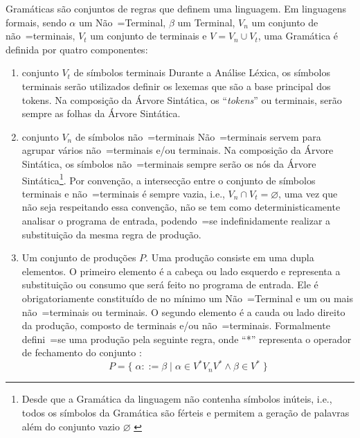 {    Gramáticas são conjuntos de regras que definem uma linguagem.
    Em linguagens formais,
    sendo $\alpha$ um Não~=Terminal,
    $\beta$ um Terminal,
    $V_n$ um conjunto de não~=terminais,
    $V_t$ um conjunto de terminais e
    $V = V_n \cup V_t$,
    uma Gramática é definida por quatro componentes:
    \begin{enumerate}%
        \item {} conjunto $V_t$ de símbolos terminais%
        Durante a Análise Léxica,
        os símbolos terminais serão utilizados definir os lexemas que são a base principal dos tokens.
        Na composição da Árvore Sintática,
        os ``\textit{tokens}'' ou terminais,
        serão sempre as folhas da Árvore Sintática.

        \item {} conjunto $V_n$ de símbolos
        não~=terminais
        Não~=terminais servem para agrupar vários não~=terminais e\slash{}ou terminais.
        Na composição da Árvore Sintática,
        os símbolos não~=terminais sempre serão os nós da Árvore Sintática\footnote{
        Desde que a Gramática da linguagem não contenha símbolos inúteis,
        i.e.,
        todos os símbolos da Gramática são férteis e
        permitem a geração de palavras além do conjunto vazio $\varnothing$ \cite{hopcroftBook}
        }.
        Por convenção,
        a intersecção entre o conjunto de símbolos terminais e
        não~=terminais é sempre vazia,
        i.e.,
        $V_n \cap V_t = \varnothing$,
        uma vez que não seja respeitando essa convenção,
        não se tem como deterministicamente analisar o programa de entrada,
        podendo~=se indefinidamente realizar a substituição da mesma regra de produção.

        \item \label{definicaoDeGramatica}Um conjunto de produções $P$.
        Uma produção consiste em uma dupla elementos.
        O primeiro elemento é a cabeça ou
        lado esquerdo e
        representa a substituição ou
        consumo que será feito no programa de entrada.
        Ele é obrigatoriamente constituído de no mínimo um Não~=Terminal e
        um ou mais não~=terminais ou
        terminais.
        O segundo elemento é a cauda ou
        lado direito da produção,
        composto de terminais e\slash{}ou não~=terminais.
        Formalmente defini~=se uma produção pela seguinte regra,
        onde ``*'' representa o operador de fechamento do conjunto \cite{hopcroftBook}:
        $$P = \{\; \alpha ::= \beta \;|\; \alpha \in V^* V_n V^* \land \beta \in V^* \;\}$$


\end{enumerate}}
